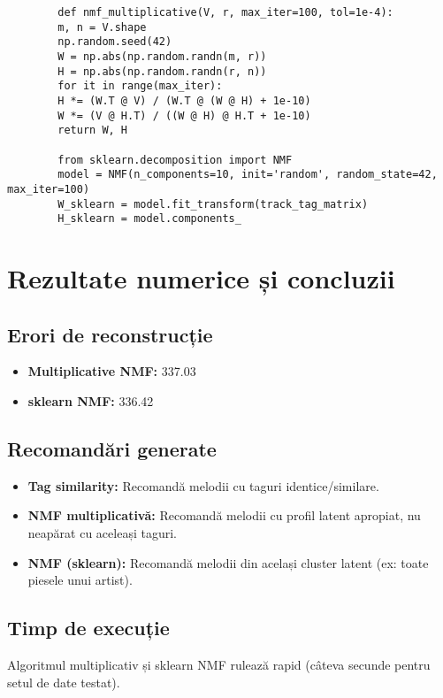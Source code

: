 \documentclass[12pt,a4paper]{article}
\begin{document}
	\begin{verbatim}
		def nmf_multiplicative(V, r, max_iter=100, tol=1e-4):
		m, n = V.shape
		np.random.seed(42)
		W = np.abs(np.random.randn(m, r))
		H = np.abs(np.random.randn(r, n))
		for it in range(max_iter):
		H *= (W.T @ V) / (W.T @ (W @ H) + 1e-10)
		W *= (V @ H.T) / ((W @ H) @ H.T + 1e-10)
		return W, H
		
		from sklearn.decomposition import NMF
		model = NMF(n_components=10, init='random', random_state=42, max_iter=100)
		W_sklearn = model.fit_transform(track_tag_matrix)
		H_sklearn = model.components_
	\end{verbatim}
	
	\section{Rezultate numerice și concluzii}
	
	\subsection{Erori de reconstrucție}
	
	\begin{itemize}
		\item \textbf{Multiplicative NMF:} 337.03
		\item \textbf{sklearn NMF:} 336.42
	\end{itemize}
	
	\subsection{Recomandări generate}
	
	\begin{itemize}
		\item \textbf{Tag similarity:} Recomandă melodii cu taguri identice/similare.
		\item \textbf{NMF multiplicativă:} Recomandă melodii cu profil latent apropiat, nu neapărat cu aceleași taguri.
		\item \textbf{NMF (sklearn):} Recomandă melodii din același cluster latent (ex: toate piesele unui artist).
	\end{itemize}
	
	\subsection{Timp de execuție}
	
	Algoritmul multiplicativ și sklearn NMF rulează rapid (câteva secunde pentru setul de date testat).
	
\end{document}
